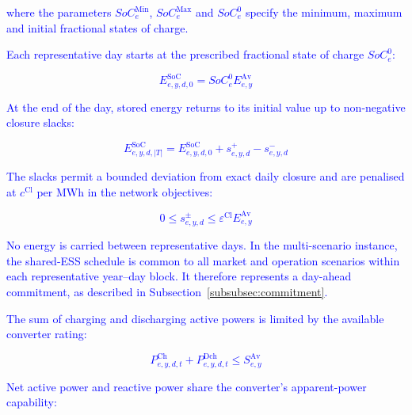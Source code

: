 \documentclass[preprint,12pt]{elsarticle}
\begin{document}
\noindent
\textcolor{blue}{
    where the parameters $SoC^{\text{Min}}_e$, $SoC^{\text{Max}}_e$ and $SoC^0_e$ specify the minimum, maximum and initial fractional states of charge.
}

\textcolor{blue}{
    Each representative day starts at the prescribed fractional state of charge $SoC^0_e$:
}

\textcolor{blue}{
    \begin{equation}
        E^{\text{SoC}}_{e,y,d,0}
        =
        SoC^0_e E^{\text{Av}}_{e,y}
        \label{eq:soc_initial}
    \end{equation}
}

\textcolor{blue}{
    At the end of the day, stored energy returns to its initial value up to non-negative closure slacks:
}

\textcolor{blue}{
    \begin{equation}
        E^{\text{SoC}}_{e,y,d,|T|}
        =
        E^{\text{SoC}}_{e,y,d,0}
        + s^+_{e,y,d} - s^-_{e,y,d}
        \label{eq:soc_closure}
    \end{equation}
}

\textcolor{blue}{
    The slacks permit a bounded deviation from exact daily closure and are penalised at $c^{\text{Cl}}$ per MWh in the network objectives:
}

\textcolor{blue}{
    \begin{equation}
        0 \le s^\pm_{e,y,d}
        \le \varepsilon^{\text{Cl}} E^{\text{Av}}_{e,y}
        \label{eq:soc_closure_slack}
    \end{equation}
}

\textcolor{blue}{
    No energy is carried between representative days.    
    In the multi-scenario instance, the shared-ESS schedule is common to all market and operation scenarios within each representative year--day block. It therefore represents a day-ahead commitment, as described in Subsection~\ref{subsubsec:commitment}.    
}

\textcolor{blue}{
    The sum of charging and discharging active powers is limited by the available converter rating:
}

\textcolor{blue}{
    \begin{equation}
        P^{\text{Ch}}_{e,y,d,t}
        + P^{\text{Dch}}_{e,y,d,t}
        \le S^{\text{Av}}_{e,y}
        \label{eq:storage_active_power_limit}
    \end{equation}
}

\textcolor{blue}{
    Net active power and reactive power share the converter's apparent-power capability:
}
\end{document}
